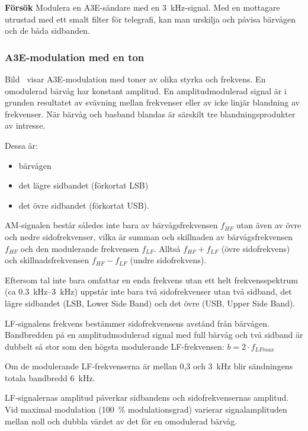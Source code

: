 \noindent\textbf{Försök}
%
Modulera en A3E-sändare med en \qty{3}{\kilo\hertz}-signal.
Med en mottagare utrustad med ett smalt filter för telegrafi, kan man urskilja
och påvisa bärvågen och de båda sidbanden.

\subsubsection{A3E-modulation med en ton}


Bild~ visar A3E-modulation med toner av olika styrka och
frekvens.
En omodulerad bärvåg har konstant amplitud.
En amplitudmodulerad signal är i grunden resultatet av svävning mellan
frekvenser eller av icke linjär blandning av frekvenser.
När bärvåg och basband blandas är särskilt tre blandningsprodukter av
intresse.

Dessa är:
\begin{itemize}
\item bärvågen
\item det lägre sidbandet (förkortat LSB)
\item det övre sidbandet (förkortat USB).
\end{itemize}

AM-signalen består således inte bara av bärvågsfrekvensen \(f_{HF}\) utan även
av övre och nedre sidofrekvenser, vilka är summan och skillnaden av
bärvågsfrekvensen \(f_{HF}\) och den modulerande frekvensen \(f_{LF}\).
Alltså \(f_{HF} + f_{LF}\) (övre sidofrekvens) och skillnadsfrekvensen
\(f_{HF} - f_{LF}\) (undre sidofrekvens).

Eftersom tal inte bara omfattar en enda frekvens utan ett helt frekvensspektrum
(ca \SIrange{0,3}{3}{\kilo\hertz}) uppstår inte bara två sidofrekvenser utan två
sidband, det lägre sidbandet (LSB, Lower Side Band) och det övre (USB, Upper
Side Band).

LF-signalens frekvens bestämmer sidofrekvensens avstånd från bärvågen.
Bandbredden på en amplitudmodulerad signal med full bärvåg och två sidband är
dubbelt så stor som den högsta modulerande LF-frekvensen:
\(b= 2 \cdot f_{LFmax}\)

Om de modulerande LF-frekvenserna är mellan 0,3 och \qty{3}{\kilo\hertz} blir
sändningens totala bandbredd \qty{6}{\kilo\hertz}.

LF-signalernas amplitud påverkar sidbandens och sidofrekvensernas amplitud.
Vid maximal modulation (100~\% modulationsgrad) varierar signalamplituden mellan
noll och dubbla värdet av det för en omodulerad bärvåg.

